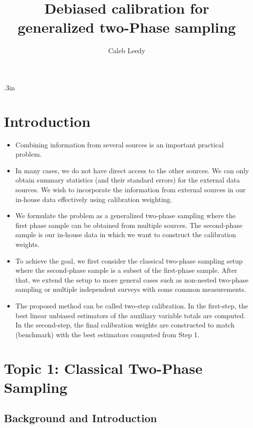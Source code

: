 \documentclass[12pt]{article}
\begin{document}
\title{Debiased calibration for generalized two-Phase sampling}
\author{Caleb Leedy}
\maketitle 

\baselineskip .3in


\section{Introduction}

\begin{itemize}
\item Combining information from several sources is an important practical problem. 
\item In many cases, we do not have direct access to the other sources. We can only obtain summary statistics (and their standard errors) for the external data sources. We wish to incorporate the information from external  sources in our in-house data effectively using calibration weighting.  
\item We formulate the problem as a generalized two-phase sampling where the first phase sample can be obtained from multiple sources. The second-phase sample is our in-house data in which we want to construct the calibration weights. 
\item To achieve the goal, we first consider  the  classical two-phase sampling setup where the second-phase sample is a subset of the first-phase sample. After that, we extend the setup to more general cases such as non-nested two-phase sampling or multiple independent surveys with some common measurements. 
\item The proposed method can be called two-step calibration. In the first-step, the best linear unbiased estimators of the auxiliary variable totals are computed. In the second-step, the final calibration weights are constructed to match (benchmark) with the best estimators computed from Step 1. 
\end{itemize}
\section{Topic 1: Classical Two-Phase Sampling}

\subsection{Background and Introduction}
\end{document}
